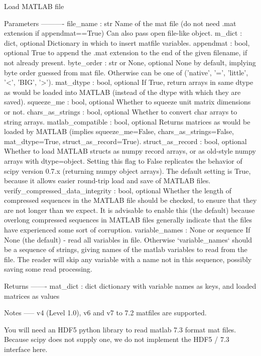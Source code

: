 \begin{DoxyVerb}Load MATLAB file

Parameters
----------
file_name : str
   Name of the mat file (do not need .mat extension if
   appendmat==True) Can also pass open file-like object.
m_dict : dict, optional
    Dictionary in which to insert matfile variables.
appendmat : bool, optional
   True to append the .mat extension to the end of the given
   filename, if not already present.
byte_order : str or None, optional
   None by default, implying byte order guessed from mat
   file. Otherwise can be one of ('native', '=', 'little', '<',
   'BIG', '>').
mat_dtype : bool, optional
   If True, return arrays in same dtype as would be loaded into
   MATLAB (instead of the dtype with which they are saved).
squeeze_me : bool, optional
   Whether to squeeze unit matrix dimensions or not.
chars_as_strings : bool, optional
   Whether to convert char arrays to string arrays.
matlab_compatible : bool, optional
   Returns matrices as would be loaded by MATLAB (implies
   squeeze_me=False, chars_as_strings=False, mat_dtype=True,
   struct_as_record=True).
struct_as_record : bool, optional
   Whether to load MATLAB structs as numpy record arrays, or as
   old-style numpy arrays with dtype=object.  Setting this flag to
   False replicates the behavior of scipy version 0.7.x (returning
   numpy object arrays).  The default setting is True, because it
   allows easier round-trip load and save of MATLAB files.
verify_compressed_data_integrity : bool, optional
    Whether the length of compressed sequences in the MATLAB file
    should be checked, to ensure that they are not longer than we expect.
    It is advisable to enable this (the default) because overlong
    compressed sequences in MATLAB files generally indicate that the
    files have experienced some sort of corruption.
variable_names : None or sequence
    If None (the default) - read all variables in file. Otherwise
    `variable_names` should be a sequence of strings, giving names of the
    matlab variables to read from the file.  The reader will skip any
    variable with a name not in this sequence, possibly saving some read
    processing.

Returns
-------
mat_dict : dict
   dictionary with variable names as keys, and loaded matrices as
   values

Notes
-----
v4 (Level 1.0), v6 and v7 to 7.2 matfiles are supported.

You will need an HDF5 python library to read matlab 7.3 format mat
files.  Because scipy does not supply one, we do not implement the
HDF5 / 7.3 interface here.\end{DoxyVerb}
 \hypertarget{namespacescipy_1_1io_1_1matlab_1_1mio_a9075c4a7be0081e31fa4ef749ad9fc0c}{}
